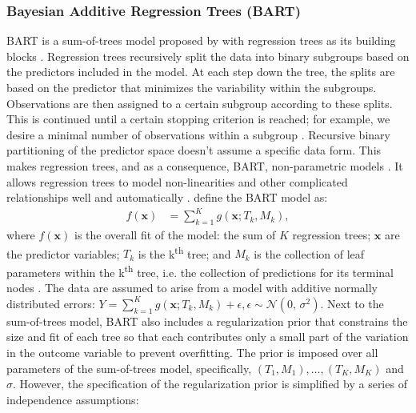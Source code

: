 \documentclass[3p,12pt,a4paper]{elsarticle}
\begin{document}
\subsubsection{Bayesian Additive Regression Trees (BART)} \label{sec:bart}
BART is a sum-of-trees model proposed by \citet{chipman2010} with regression trees as its building blocks \citep{chipman2010, hill2020, james2021}. Regression trees recursively split the data into binary subgroups based on the predictors included in the model. At each step down the tree, the splits are based on the predictor that minimizes the variability within the subgroups. Observations are then assigned to a certain subgroup according to these splits. This is continued until a certain stopping criterion is reached; for example, we desire a minimal number of observations within a subgroup \citep{hastie2017, james2021, salditt2023, breiman1984}. Recursive binary partitioning of the predictor space doesn't assume a specific data form. This makes regression trees, and as a consequence, BART, non-parametric models \citep{hastie2017, james2021, salditt2023, breiman1984}. It allows regression trees to model non-linearities and other complicated relationships well and automatically \citep{hill2020, burgette2010}.
\citet{chipman2010} define the BART model as:
\begin{align}
\label{eq:BART}
f(\textbf{x}) &= \sum^{K}_{k=1}g(\textbf{x}; T_{k}, M_{k}),
\end{align} where $f(\mathbf{x})$ is the overall fit of the model: the sum of $K$ regression trees; $\textbf{x}$ are the predictor variables; $T_{k}$ is the k\textsuperscript{th} tree; and $M_{k}$ is the collection of leaf parameters within the k\textsuperscript{th} tree, i.e. the collection of predictions for its terminal nodes \citep{chipman1998, chipman2006, chipman2010, hill2020, james2021}. The data are assumed to arise from a model with additive normally distributed errors: $Y = \sum^{K}_{k=1}g(\textbf{x}; T_{k}, M_{k}) + \epsilon, \epsilon \sim \mathcal{N}(0,\,\sigma^{2})$.
Next to the sum-of-trees model, BART also includes a regularization prior that constrains the size and fit of each tree so that each contributes only a small part of the variation in the outcome variable to prevent overfitting. The prior is imposed over all parameters of the sum-of-trees model, specifically, $(T_1, M_1), \dots, (T_K, M_K)$ and $\sigma$. However, the specification of the regularization prior is simplified by a series of independence assumptions: 
\end{document}

